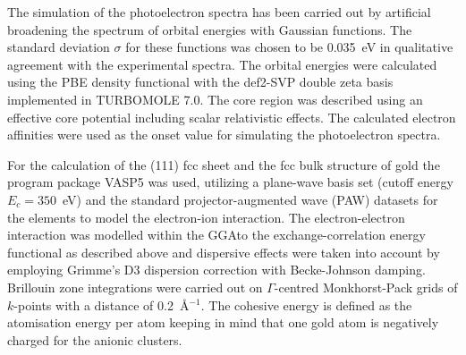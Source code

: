 The simulation of the photoelectron spectra has been carried out by artificial
broadening the spectrum of orbital energies with Gaussian functions. The
standard deviation $\sigma$ for these functions was chosen to be 0.035~eV in
qualitative agreement with the experimental spectra. The orbital energies were
calculated using the PBE density functional with the
def2-SVP\autocite{Weigend_Balancedbasissets_2005} double zeta basis implemented
in TURBOMOLE 7.0.\autocite{_TURBOMOLEV72015_} The core region was described
using an effective core potential including scalar relativistic effects.  The
calculated electron affinities were used as the onset value for simulating the
photoelectron spectra. 


For the calculation of the (111) fcc sheet and the fcc bulk structure of gold
the program package VASP5\autocite{Kresse_Efficiencyabinitiototal_1996} was used,
utilizing a plane-wave basis set (cutoff energy $E_c=350$~eV) and the standard
projector-augmented wave (PAW) datasets for the elements to model the
electron-ion
interaction\autocite{Blochl_Projectoraugmentedwavemethod_1994,Kresse_ultrasoftpseudopotentialsprojector_1999}.
The electron-electron interaction was modelled within the \ac{GGA}to the
exchange-correlation energy functional as described above and dispersive
effects were taken into account by employing Grimme's D3 dispersion correction
with Becke-Johnson
damping.\autocite{Grimme_consistentaccurateinitio_2010,Grimme_Effectdampingfunction_2011}
Brillouin zone integrations were carried out on $\Gamma$-centred Monkhorst-Pack
grids of $k$-points with a distance of 0.2~\AA$^{-1}$. The cohesive energy is
defined as the atomisation energy per atom keeping in mind that one gold atom
is negatively charged for the anionic clusters.

